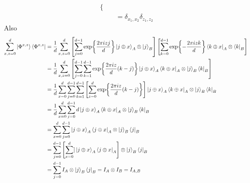 \documentclass[a4paper, 11pt]{article}
\begin{document}
{\begin{align*}
\begin{cases}
	\end{cases}\\[3mm]
	& = \delta_{x_1,x_2}\delta_{z_1,z_2}
\end{align*}Also 
\begin{align*}
\sum_{x,z=0}^d\ket{\Phi^{x,z}} 	\bra{\Phi^{x,z}} & = \frac1d \sum_{x,z=0}^d\left[ \sum_{j=0}^{d-1}\exp{\frac{2\pi izj}{d}}\ket{j\oplus x}_A\otimes \ket{j}_B \right]\left[\sum_{k=0}^{d-1}\exp{-\frac{2\pi izk}{d}}\bra{k\oplus x}_A\otimes \bra{k}_B\right]\\
& = \frac1d\sum_{x,z=0}^d\left[   \sum_{j=0}^{d-1}\sum_{k=1}^{d-1} \exp{\frac{2\pi iz}{d}(k-j)}\ket{j\oplus x}_A\bra{k\oplus x}_A\otimes\ket{j}_B\bra{k}_B   \right]\\
& = \frac1d\sum_{x=0}^d\sum_{j=0}^{d-1}\sum_{k=1}^{d-1} \left[  \sum_{z=0}^d \exp{\frac{2\pi iz}{d}(k-j)} \right]\ket{j\oplus x}_A\bra{k\oplus x}_A\otimes\ket{j}_B\bra{k}_B  \\
& = \frac1d\sum_{x=0}^d\sum_{j=0}^{d-1} d\ket{j\oplus x}_A\bra{k\oplus x}_A\otimes\ket{j}_B\bra{k}_B \\
& =  \sum_{x=0}^d\sum_{j=0}^{d-1} \ket{j\oplus x}_A\bra{j\oplus x}_A\otimes\ket{j}_B\bra{j}_B\\
& = \sum_{j=0}^{d-1} \left[ \sum_{x=0}^d]\ket{j\oplus x}_A\bra{j\oplus x}_A\right]\otimes\ket{j}_B\bra{j}_B\\
& = \sum_{j=0}^{d-1} I_A\otimes\ket{j}_B\bra{j}_B= I_A\otimes I_B=I_{A,B}
\end{align*}
}

\end{document}
